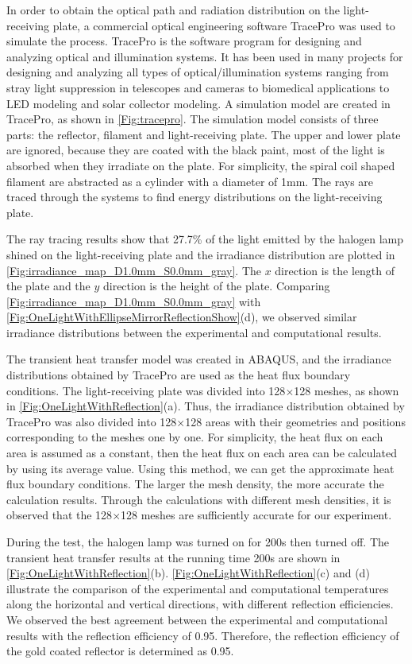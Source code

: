 In order to obtain the optical path and radiation distribution on the light-receiving plate, a commercial optical engineering software TracePro was used to simulate the process. 
TracePro is the software program for designing and analyzing optical and illumination systems.
It has been used in many projects for designing and analyzing all types of optical/illumination systems ranging from stray light suppression in telescopes and cameras to biomedical applications to LED modeling and solar collector modeling.
A simulation model are created in TracePro, as shown in \ref{Fig:tracepro}.
The simulation model consists of three parts: the reflector, filament and light-receiving plate.
The upper and lower plate are ignored, because they are coated with the black paint, most of the light is absorbed when they irradiate on the plate.
For simplicity, the spiral coil shaped filament are abstracted as a cylinder with a diameter of 1mm.
The rays are traced through the systems to find energy distributions on the light-receiving plate.

The ray tracing results show that 27.7\% of the light emitted by the halogen lamp shined on the light-receiving plate and the irradiance distribution are plotted in \ref{Fig:irradiance_map_D1.0mm_S0.0mm_gray}.
The $x$ direction is the length of the plate and the $y$ direction is the height of the plate. Comparing \ref{Fig:irradiance_map_D1.0mm_S0.0mm_gray} with \ref{Fig:OneLightWithEllipseMirrorReflectionShow}(d), we observed similar irradiance distributions between the experimental and computational results.

The transient heat transfer model was created in ABAQUS, and the irradiance distributions obtained by TracePro are used as the heat flux boundary conditions.
The light-receiving plate was divided into 128$\times$128 meshes, as shown in \ref{Fig:OneLightWithReflection}(a). Thus, the irradiance distribution obtained by TracePro was also divided into 128$\times$128 areas with their geometries and positions corresponding to the meshes one by one. For simplicity, the heat flux on each area is assumed as a constant, then the heat flux on each area can be calculated by using its average value. Using this method, we can get the approximate heat flux boundary conditions. The larger the mesh density, the more accurate the calculation results. Through the calculations with different mesh densities, it is observed that the 128$\times$128 meshes are sufficiently accurate for our experiment. 

During the test, the halogen lamp was turned on for 200s then turned off. The transient heat transfer results at the running time 200s are shown in \ref{Fig:OneLightWithReflection}(b). \ref{Fig:OneLightWithReflection}(c) and (d) illustrate the comparison of the experimental and computational temperatures along the horizontal and vertical directions, with different reflection efficiencies. We observed the best agreement between the experimental and computational results with the reflection efficiency of 0.95. Therefore, the reflection efficiency of the gold coated reflector is determined as 0.95.

